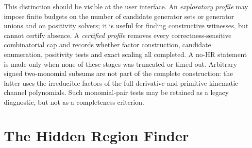 \documentclass[a4paper,11pt]{article}
\begin{document}
This distinction should be visible at the user interface.  An
\emph{exploratory profile} may impose finite budgets on the number of
candidate generator sets or generator unions and on positivity solvers; it
is useful for finding constructive witnesses, but cannot certify absence.  A
\emph{certified profile} removes every correctness-sensitive combinatorial
cap and records whether factor construction, candidate enumeration,
positivity tests and exact scaling all completed.  A no-HR statement is made
only when none of these stages was truncated or timed out.  Arbitrary signed
two-monomial subsums are not part of the complete construction: the latter
uses the irreducible factors of the full derivative and primitive
kinematic-channel polynomials.  Such monomial-pair tests may be retained as a
legacy diagnostic, but not as a completeness criterion.

\section{The Hidden Region Finder}
\label{sec:workflow}
\end{document}
